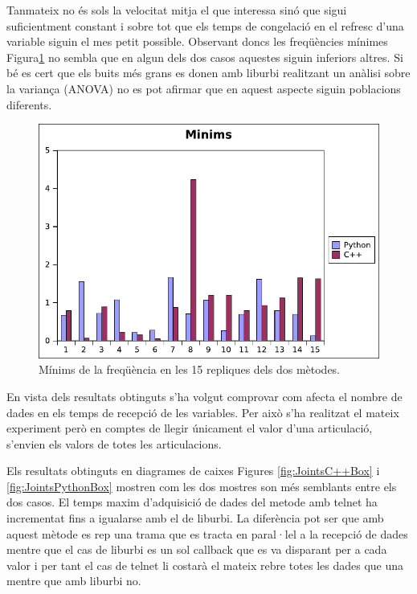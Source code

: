 \documentclass[12pt,a4paper,final,twoside]{article}
\begin{document}
Tanmateix no és sols la velocitat mitja el que interessa sinó que sigui suficientment constant i sobre tot que els temps de congelació en el refresc d'una variable siguin el mes petit possible.
Observant doncs les freqüències mínimes Figura\ref{fig:MinOneLeg} no sembla que en algun dels dos casos aquestes siguin inferiors altres. Si bé es cert que els buits més grans es donen amb liburbi realitzant un anàlisi sobre la variança (ANOVA) no es pot afirmar que en aquest aspecte siguin poblacions diferents. 

\begin{figure}[H]
	\centering
    \includegraphics[scale=1]{images/MinOneLeg.pdf}
	 \caption{Mínims de la freqüència en les 15 repliques dels dos mètodes.}
  \label{fig:MinOneLeg}
\end{figure}

En vista dels resultats obtinguts s'ha volgut comprovar com afecta el nombre de dades en els temps de recepció de les variables. Per això s'ha realitzat el mateix experiment però en comptes de llegir únicament el valor d'una articulació, s'envien els valors de totes les articulacions.

Els resultats obtinguts en diagrames de caixes Figures \ref{fig:JointsC++Box} i \ref{fig:JointsPythonBox} mostren com les dos mostres son més semblants entre els dos casos. El temps maxim d'adquisició de dades del metode amb telnet ha incrementat fins a igualarse amb el de liburbi. La diferència pot ser que amb aquest mètode es rep una trama que es tracta en paral·lel a la recepció de dades mentre que el cas de liburbi es un sol callback que es va disparant per a cada valor i per tant el cas de telnet li costarà el mateix rebre totes les dades que una mentre que amb liburbi no.
\end{document}
